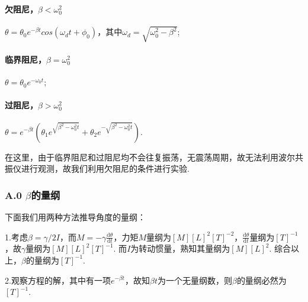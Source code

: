 \documentclass[UTF8]{ctexart}
\begin{document}
\paragraph{欠阻尼，$\beta<\omega_0^2$}$\theta=\theta_0e^{-\beta t}cos(\omega_d t+\phi_0)$，其中$\omega_d=\sqrt{\omega_0^2-\beta^2}$;
\paragraph{临界阻尼，$\beta=\omega_0^2$}$\theta=\theta_0e^{-\omega_0t}$;
\paragraph{过阻尼，$\beta>\omega_0^2$}$\theta=e^{-\beta t}(\theta_1e^{\sqrt{\beta^2-\omega_0^2t}}+\theta_2e^{-\sqrt{\beta^2-\omega_0^2t}})$.\par
在这里，由于临界阻尼和过阻尼均不会往复振荡，无震荡周期，故无法利用波尔共振仪进行观测，故我们利用欠阻尼的条件进行实验.
\subsubsection*{A.0 $\beta$的量纲}
下面我们用两种方法推导角度的量纲：\par
1.考虑$\beta=\gamma/2I$，而$M=-\gamma \frac{\mathrm{d}\theta}{\mathrm{d}t}$，力矩$M$量纲为$[M][L]^2[T]^{-2}$，$\frac{\mathrm{d}\theta}{\mathrm{d}t}$量纲为$[T]^{-1}$，故$\gamma$量纲为$[M][L]^2[T]^{-1}$. 而$I$为转动惯量，熟知其量纲为$[M][L]^2$. 综合以上，$\beta$的量纲为$[T]^{-1}$.\par
2.观察方程的解，其中有一项$e^{-\beta t}$，故知$\beta t$为一个无量纲数，则$\beta$的量纲必然为$[T]^{-1}$.
\end{document}
